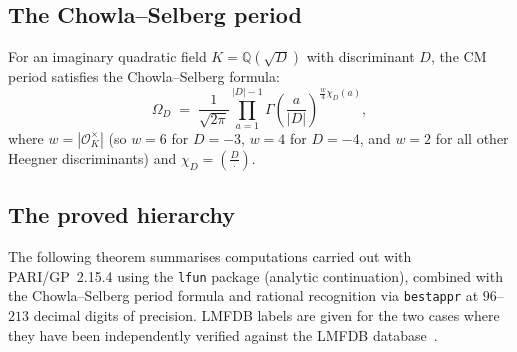 \documentclass[12pt]{amsart}
\theoremstyle{definition}
\newcommand{\Q}{\mathbb{Q}}
\newcommand{\OK}{\mathcal{O}_K}
\newcommand{\Omega}{\varOmega}
\begin{document}
\subsection{The Chowla--Selberg period}

For an imaginary quadratic field $K = \Q(\sqrt{D})$ with discriminant $D$,
the CM period satisfies the Chowla--Selberg formula:
\begin{equation}
  \label{eq:CS}
  \Omega_D \;=\; \frac{1}{\sqrt{2\pi}} \prod_{a=1}^{|D|-1}
    \Gamma\!\left(\frac{a}{|D|}\right)^{\!\frac{w}{4}\chi_D(a)},
\end{equation}
where $w = |\OK^{\times}|$ (so $w=6$ for $D=-3$, $w=4$ for $D=-4$, and
$w=2$ for all other Heegner discriminants) and $\chi_D = \left(\frac{D}{\cdot}\right)$.

\subsection{The proved hierarchy}

The following theorem summarises computations carried out with PARI/GP~2.15.4
using the \texttt{lfun} package (analytic continuation), combined with the
Chowla--Selberg period formula and rational recognition via \texttt{bestappr}
at $96$--$213$ decimal digits of precision.
LMFDB labels are given for the two cases where they have been independently
verified against the LMFDB database~\cite{LMFDB2026}.
\end{document}
